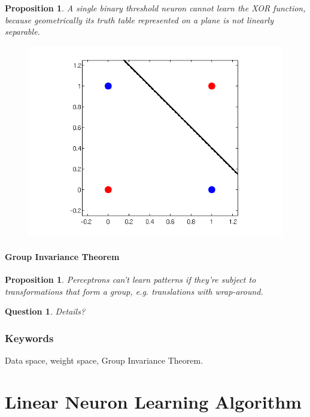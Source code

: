 \documentclass[12pt]{article}
\theoremstyle{plain}
\newtheorem{proposition}[theorem]{Proposition}
\newtheorem{question}[theorem]{Question}
\theoremstyle{definition}
\theoremstyle{remark}
\begin{document}
\begin{proposition}
A single binary threshold neuron cannot learn the XOR function, because geometrically its truth table represented on a plane is not linearly separable.
\end{proposition}

\begin{figure}[H]
\centering
\includegraphics[width=1.0\textwidth]{linSepXor}
\end{figure}

\subsection{Group Invariance Theorem}

\begin{proposition}
Perceptrons can't learn patterns if they're subject to transformations that form a group, e.g. translations with wrap-around.
\end{proposition}

\begin{question}
Details?
\end{question}

\section{Keywords}

Data space, weight space, Group Invariance Theorem.

\part{Linear Neuron Learning Algorithm}
\end{document}
